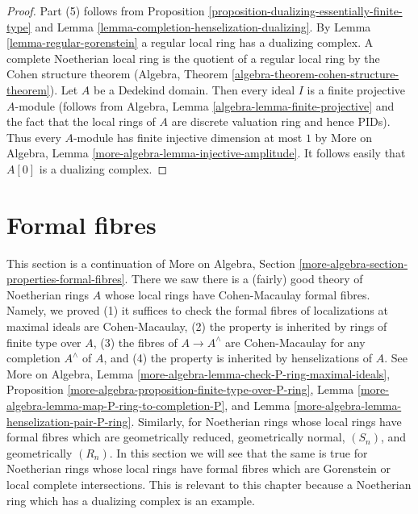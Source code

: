 \documentclass{stacks-project}
\theoremstyle{plain}
\theoremstyle{definition}
\theoremstyle{remark}
\numberwithin{equation}{subsection}
\begin{document}
\begin{proof}
Part (5) follows from Proposition
\ref{proposition-dualizing-essentially-finite-type}
and Lemma \ref{lemma-completion-henselization-dualizing}.
By Lemma \ref{lemma-regular-gorenstein} a regular local ring has a
dualizing complex.
A complete Noetherian local ring is the quotient of a regular
local ring by the Cohen structure theorem
(Algebra, Theorem \ref{algebra-theorem-cohen-structure-theorem}).
Let $A$ be a Dedekind domain. Then every ideal $I$ is a finite
projective $A$-module (follows from
Algebra, Lemma \ref{algebra-lemma-finite-projective}
and the fact that the local rings of $A$ are discrete valuation ring
and hence PIDs). Thus every $A$-module has finite injective dimension
at most $1$ by
More on Algebra, Lemma \ref{more-algebra-lemma-injective-amplitude}.
It follows easily that $A[0]$ is a dualizing complex.
\end{proof}





\section{Formal fibres}
\label{section-formal-fibres}

\noindent
This section is a continuation of
More on Algebra, Section \ref{more-algebra-section-properties-formal-fibres}.
There we saw there is a (fairly) good theory of Noetherian rings $A$
whose local rings have Cohen-Macaulay formal fibres. Namely, we proved
(1) it suffices to check the formal fibres of localizations at
maximal ideals are Cohen-Macaulay,
(2) the property is inherited by rings of finite type over $A$,
(3) the fibres of $A \to A^\wedge$ are Cohen-Macaulay for
any completion $A^\wedge$ of $A$, and
(4) the property is inherited by henselizations of $A$. See
More on Algebra, Lemma \ref{more-algebra-lemma-check-P-ring-maximal-ideals},
Proposition \ref{more-algebra-proposition-finite-type-over-P-ring},
Lemma \ref{more-algebra-lemma-map-P-ring-to-completion-P}, and
Lemma \ref{more-algebra-lemma-henselization-pair-P-ring}.
Similarly, for Noetherian rings whose local rings have formal fibres
which are geometrically reduced, geometrically normal, $(S_n)$, and
geometrically $(R_n)$.
In this section we will see that the same is true for Noetherian rings
whose local rings have formal fibres which are Gorenstein
or local complete intersections.
This is relevant to this chapter because a Noetherian ring which has a
dualizing complex is an example.
\end{document}
